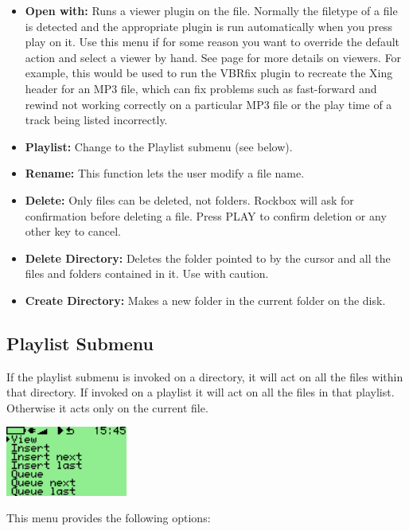 \begin{itemize}
\item \textbf{Open with:} Runs a viewer plugin on the file. 
Normally the filetype of a file is detected and the appropriate plugin
is run automatically when you press play on it.  Use this menu if for
some reason you want to override the default action and select a viewer
by hand.  See page \textmd{\pageref{ref:Viewersplugins}} for more details on viewers.
For example, this would be used to run the VBRfix plugin to recreate the
Xing header for an MP3 file, which can fix problems such as
fast{}-forward and rewind not working correctly on a particular MP3 file or the play time of a track being listed incorrectly. 
\item \textbf{Playlist:} Change to the Playlist submenu (see below).
\item \textbf{Rename:} This function lets the user modify a file name.
\item \textbf{Delete:} Only files can be deleted, not folders. Rockbox will ask for confirmation before deleting a file. Press PLAY to confirm deletion or any other key to cancel.
\item \textbf{Delete Directory: }Deletes the folder pointed to by the cursor and all the files and folders contained in it.  Use with caution.
\item \textbf{Create Directory:} Makes a new folder in the current folder on
the disk.
\end{itemize}


\subsection{\label{ref:Playlistsubmenu}Playlist Submenu}
If the playlist submenu is invoked on a directory, it will act on all the files within that directory.  If invoked on a playlist it will act on all the files in that playlist. Otherwise it acts only on the current file.
\begin{center}
  \includegraphics[width=4cm]{rockbox_interface/images/ss-playlist-menu-112x64x1.png}
\end{center}
This menu provides the following options:

